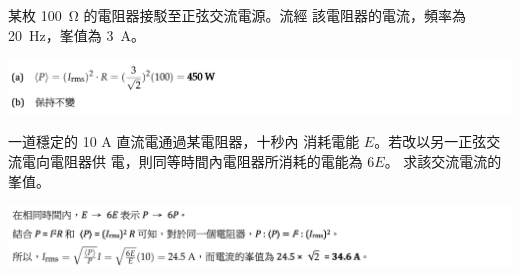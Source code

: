 {
    某枚  \qty{100}{\ohm} 的電阻器接駁至正弦交流電源。流經 該電阻器的電流，頻率為 \qty{20}{Hz}，峯值為 \qty{3}{A}。
}{
    \par{\par\centering\includegraphics[width=\textwidth]{./img/ch_ACtransformer_lq_2024-06-17-20-34-20.png}\par}
}

{
    一道穩定的 10 A 直流電通過某電阻器，十秒內 消耗電能 $E$。若改以另一正弦交流電向電阻器供 電，則同等時間內電阻器所消耗的電能為 $6E$。 求該交流電流的峯值。
}{
    \par{\par\centering\includegraphics[width=\textwidth]{./img/ch_ACtransformer_lq_2024-06-17-20-34-42.png}\par}
}

